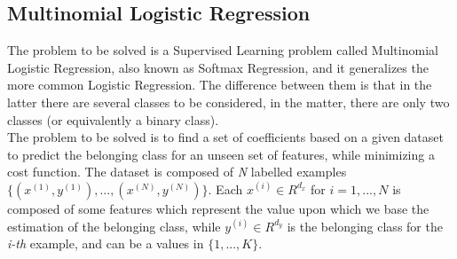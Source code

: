 \documentclass[a4paper,11pt,oneside]{book}
\begin{document}
\subsection {Multinomial Logistic Regression} \label{Subsec1.1.2}
The problem to be solved is a Supervised Learning problem called Multinomial Logistic Regression, also known as Softmax Regression, and it generalizes the more common Logistic Regression. The difference between them is that in the latter there are several classes to be considered, in the matter, there are only two classes (or equivalently a binary class).\\
The problem to be solved is to find a set of coefficients based on a given dataset to predict the belonging class for an unseen set of features, while minimizing a cost function. The dataset is composed of \textit{N} labelled examples $\{(x^{(1)}, y^{(1)}), ..., (x^{(N)}, y^{(N)})\}$. Each $x^{(i)} \in R^{d_{x}}$ for $i=1, ..., N$ is composed of some features which represent the value upon which we base the estimation of the belonging class, while $y^{(i)} \in R^{d_{y}}$ is the belonging class for the \textit{i-th} example, and can be a values in $\{1, ..., K\}$.
\end{document}
